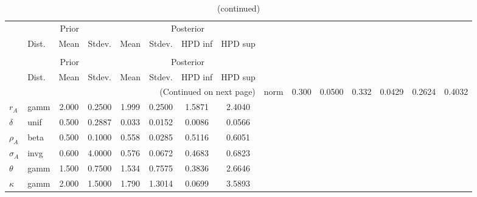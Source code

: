  
\begin{center}
\begin{longtable}{llcccccc} 
\caption{Results from Metropolis-Hastings (parameters)}
 \label{Table:MHPosterior:1}\\
\toprule 
  & \multicolumn{3}{c}{Prior}  &  \multicolumn{4}{c}{Posterior} \\
  \cmidrule(r{.75em}){2-4} \cmidrule(r{.75em}){5-8}
  & Dist. & Mean  & Stdev. & Mean & Stdev. & HPD inf & HPD sup\\
\midrule \endfirsthead 
\caption{(continued)}\\\toprule 
  & \multicolumn{3}{c}{Prior}  &  \multicolumn{4}{c}{Posterior} \\
  \cmidrule(r{.75em}){2-4} \cmidrule(r{.75em}){5-8}
  & Dist. & Mean  & Stdev. & Mean & Stdev. & HPD inf & HPD sup\\
\midrule \endhead 
\bottomrule \multicolumn{8}{r}{(Continued on next page)} \endfoot 
\bottomrule \endlastfoot 
${\alpha}$ & norm &   0.300 & 0.0500 &   0.332& 0.0429 &  0.2624 &  0.4032 \\ 
${r_{A}}$ & gamm &   2.000 & 0.2500 &   1.999& 0.2500 &  1.5871 &  2.4040 \\ 
${\delta}$ & unif &   0.500 & 0.2887 &   0.033& 0.0152 &  0.0086 &  0.0566 \\ 
${\rho_A}$ & beta &   0.500 & 0.1000 &   0.558& 0.0285 &  0.5116 &  0.6051 \\ 
${\sigma_A}$ & invg &   0.600 & 4.0000 &   0.576& 0.0672 &  0.4683 &  0.6823 \\ 
${\theta}$ & gamm &   1.500 & 0.7500 &   1.534& 0.7575 &  0.3836 &  2.6646 \\ 
${\kappa}$ & gamm &   2.000 & 1.5000 &   1.790& 1.3014 &  0.0699 &  3.5893 \\ 
\end{longtable}
 \end{center}
